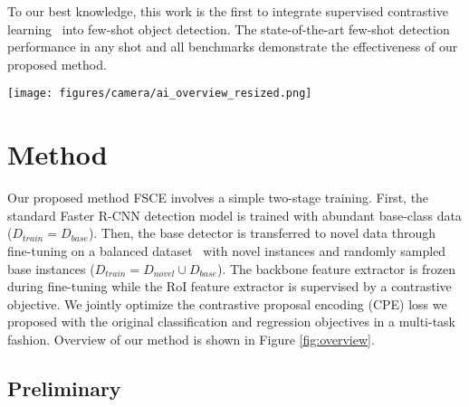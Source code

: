 \documentclass[final]{cvpr}
\begin{document}
To our best knowledge, this work is the first to integrate supervised contrastive learning~\cite{sun2014deep,supervised_contrastive_learning} into few-shot object detection. The state-of-the-art few-shot detection performance in any shot and all benchmarks demonstrate the effectiveness of our proposed method.




\begin{figure*}[t]
\texttt{[image: figures/camera/ai\_overview\_resized.png]}
\centering
\caption{Overview of our proposed FSCE. In our method, we jointly fine-tune the FPN pathway and RPN while fixing the backbone. We find this is effective in coordinating backbone feature maps to activate on novel objects yet still avoid the risk of overfitting. To learn contrastive object proposal encodings, we introduce a contrastive branch to guide the RoI features to learn contrastive-aware proposal embeddings. We design a contrastive objective to maximize the within-category agreement and cross-category disagreement.} 
\label{fig:overview}\end{figure*}




\section{Method}
Our proposed method FSCE involves a simple two-stage training. First, the standard Faster R-CNN detection model is trained with abundant base-class data ($D_{train}=D_{base}$). Then, the base detector is transferred to novel data through fine-tuning on a balanced dataset~\cite{wang_cspnet_2019} with novel instances and randomly sampled base instances ($D_{train}=D_{novel}\cup D_{base}$). The backbone feature extractor is frozen during fine-tuning while the RoI feature extractor is supervised by a contrastive objective. We jointly optimize the contrastive proposal encoding (CPE) loss we proposed with the original classification and regression objectives in a multi-task fashion. Overview of our method is shown in Figure \ref{fig:overview}.

\subsection{Preliminary}
\end{document}
